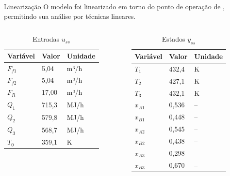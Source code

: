 \begin{frame}{Linearização}
  O modelo foi linearizado em torno do ponto de operação de
  , permitindo sua análise por técnicas lineares.
  \begin{columns}[T]
    \begin{table}
      \caption{Entradas $u_{ss}$}
      \begin{tabular}{lll}
        \hline
        Variável & Valor & Unidade \\
        \hline
        $F_{f1}$ & 5{,}04   & m³/h \\
        $F_{f2}$ & 5{,}04   & m³/h \\
        $F_R$    & 17{,}00  & m³/h \\
        $Q_1$    & 715{,}3  & MJ/h \\
        $Q_2$    & 579{,}8  & MJ/h \\
        $Q_3$    & 568{,}7  & MJ/h \\
        $T_0$    & 359{,}1  & K    \\
        \hline
      \end{tabular}
    \end{table}
    \begin{table}
      \caption{Estados $y_{ss}$}
      \begin{tabular}{lll}
        \hline
        Variável  & Valor & Unidade \\
        \hline
        $T_1$     & 432{,}4 & K  \\
        $T_2$     & 427{,}1 & K  \\
        $T_3$     & 432{,}1 & K  \\
        $x_{A1}$  & 0{,}536 & -- \\
        $x_{B1}$  & 0{,}448 & -- \\
        $x_{A2}$  & 0{,}545 & -- \\
        $x_{B2}$  & 0{,}438 & -- \\
        $x_{A3}$  & 0{,}298 & -- \\
        $x_{B3}$  & 0{,}670 & -- \\
        \hline
      \end{tabular}
    \end{table}
  \end{columns}
\end{frame}

